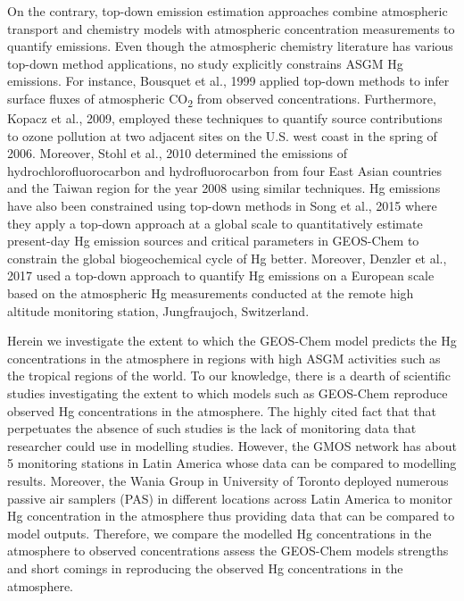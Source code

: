 \begin{flushleft}
On the contrary, top-down emission estimation approaches combine atmospheric transport and chemistry models with atmospheric concentration measurements to quantify emissions. Even though the atmospheric chemistry literature has various top-down method applications, no study explicitly constrains ASGM Hg emissions. For instance, Bousquet et al., 1999 applied top-down methods to infer surface fluxes of atmospheric CO\textsubscript{2} from observed concentrations\cite{bousquet_inverse_1999}. Furthermore, Kopacz et al., 2009, employed these techniques to quantify source contributions to ozone pollution at two adjacent sites on the U.S. west coast in the spring of 2006. Moreover, Stohl et al., 2010 determined the emissions of hydrochlorofluorocarbon and hydrofluorocarbon from four East Asian countries and the Taiwan region for the year 2008 using similar techniques. Hg emissions have also been constrained using top-down methods in Song et al., 2015 where they apply a top-down approach at a global scale to quantitatively estimate present-day Hg emission sources and critical parameters in GEOS-Chem to constrain the global biogeochemical cycle of Hg better. Moreover, Denzler et al., 2017 used a top-down approach to quantify Hg emissions on a European scale based on the atmospheric Hg measurements conducted at the remote high altitude monitoring station, Jungfraujoch, Switzerland. 
\end{flushleft}
\begin{flushleft}
Herein we investigate the extent to which the GEOS-Chem model predicts the Hg concentrations in the atmosphere in regions with high ASGM activities such as the tropical regions of the world.  To our knowledge, there is a dearth of scientific studies investigating the extent to which models such as GEOS-Chem reproduce observed Hg concentrations in the atmosphere. The highly cited fact that that perpetuates the absence of such studies is the lack of monitoring data that researcher could use in modelling studies. However, the GMOS network has about 5 monitoring stations in Latin America whose data can be compared to modelling results. Moreover, the Wania Group in University of Toronto deployed numerous passive air samplers (PAS)  in different locations across Latin America to monitor Hg concentration in the atmosphere thus providing data that can be compared to model outputs. Therefore, we compare the modelled Hg concentrations in the atmosphere to observed concentrations assess the GEOS-Chem models strengths and short comings in reproducing the observed Hg concentrations in the atmosphere. 
\end{flushleft}

